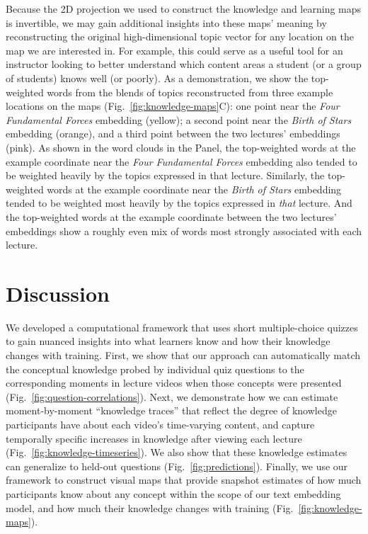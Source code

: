 \documentclass[10pt]{article}
\begin{document}
Because the 2D projection we used to construct the knowledge and learning maps
is invertible, we may gain additional insights into these maps' meaning
by reconstructing the original high-dimensional topic vector for any location
on the map we are interested in. For example, this could serve as a useful
tool for an instructor looking to better understand which content areas a
student (or a group of students) knows well (or poorly). As a demonstration, we
show the top-weighted words from the blends of topics reconstructed from three
example locations on the maps (Fig.~\ref{fig:knowledge-maps}C): one point near
the \textit{Four Fundamental Forces} embedding (yellow); a second point near
the \textit{Birth of Stars} embedding (orange), and a third point
between the two lectures' embeddings (pink). As shown in the word clouds in the
Panel, the top-weighted words at the example coordinate near the \textit{Four
Fundamental Forces} embedding also tended to be weighted heavily by the topics
expressed in that lecture. Similarly, the top-weighted words at the example
coordinate near the \textit{Birth of Stars} embedding tended to be weighted
most heavily by the topics expressed in \textit{that} lecture. And the
top-weighted words at the example coordinate between the two lectures'
embeddings show a roughly even mix of words most strongly associated with each
lecture.

\section*{Discussion}

We developed a computational framework that uses short multiple-choice quizzes
to gain nuanced insights into what learners know and how their knowledge
changes with training. First, we show that our approach can automatically match
the conceptual knowledge probed by individual quiz questions to the corresponding
moments in lecture videos when those concepts were presented
(Fig.~\ref{fig:question-correlations}). Next, we demonstrate how we can
estimate moment-by-moment ``knowledge traces'' that reflect the degree of knowledge
participants have about each video's time-varying content, and capture temporally 
specific increases in knowledge after viewing each lecture (Fig.~\ref{fig:knowledge-timeseries}).
 We also show that these knowledge estimates can generalize to held-out questions
(Fig.~\ref{fig:predictions}). Finally, we use our framework to construct visual
maps that provide snapshot estimates of how much participants know about any
concept within the scope of our text embedding model, and how much their
knowledge changes with training (Fig.~\ref{fig:knowledge-maps}).
\end{document}
